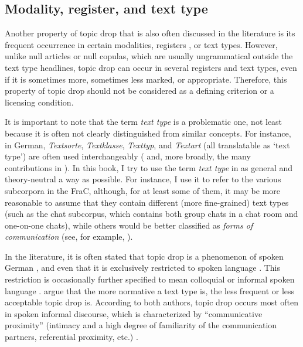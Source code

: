 \subsection{Modality, register, and text type}\label{sec:def.texttype} 
Another property of topic drop that is also often discussed in the literature is its frequent occurrence in certain modalities, registers \citep{halliday1978, biber1994}, or text types.
However, unlike null articles  or null copulas,  which are usually ungrammatical outside the text type headlines, topic drop can occur in several registers and text types, even if it is sometimes more, sometimes less marked, or appropriate.
Therefore, this property of topic drop should not be considered as a defining criterion or a licensing condition.

It is important to note that the term \textit{text type} is a problematic one, not least because it is often not clearly distinguished from similar concepts.
For instance, in German, \textit{Textsorte}, \textit{Textklasse}, \textit{Texttyp}, and \textit{Textart} (all translatable as `text type') are often used interchangeably (\cite[see, e.g.,][65]{gansel.juergens2009} and, more broadly, the many contributions in \cite{habscheid2011}).
In this book, I try to use the term \textit{text type} in as general and theory-neutral a way as possible.
For instance, I use it to refer to the various subcorpora in the FraC, although, for at least some of them, it may be more reasonable to assume that they contain different (more fine-grained) text types (such as the chat subcorpus, which contains both group chats in a chat room and one-on-one chats), while others would be better classified as \textit{forms of communication} (see, for example, \cite{durscheid2016}).

In the literature, it is often stated that topic drop is a phenomenon of spoken German \citep{huang1984,cardinaletti1990,poitou1993,jaensch2005,dittmann.etal2007,volodina2011}, and even that it is exclusively restricted to spoken language \citep[219]{volodina.onea2012}.
This restriction is occasionally further specified to mean colloquial or informal spoken language \citep{huang1984,poitou1993,jaensch2005}.
\citet[219]{volodina.onea2012} argue that the more normative a text type is, the less frequent or less acceptable topic drop is.
According to both authors, topic drop occurs most often in spoken informal discourse, which is characterized by ``communicative proximity'' (intimacy and a high degree of familiarity of the communication partners, referential proximity, etc.) \citep[221]{volodina.onea2012}.

